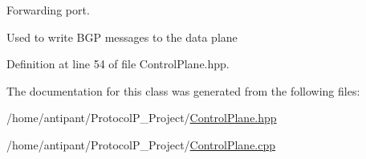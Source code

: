 Forwarding port. 

Used to write B\-G\-P messages to the data plane 

Definition at line 54 of file Control\-Plane.\-hpp.



The documentation for this class was generated from the following files\-:\begin{DoxyCompactItemize}
\item 
/home/antipant/\-Protocol\-P\-\_\-\-Project/\hyperlink{ControlPlane_8hpp}{Control\-Plane.\-hpp}\item 
/home/antipant/\-Protocol\-P\-\_\-\-Project/\hyperlink{ControlPlane_8cpp}{Control\-Plane.\-cpp}\end{DoxyCompactItemize}
